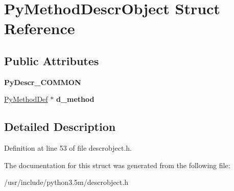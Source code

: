 \hypertarget{structPyMethodDescrObject}{}\section{Py\+Method\+Descr\+Object Struct Reference}
\label{structPyMethodDescrObject}
\subsection*{Public Attributes}
\begin{DoxyCompactItemize}
\item 
{\bfseries Py\+Descr\+\_\+\+C\+O\+M\+M\+ON}\hypertarget{structPyMethodDescrObject_acff11b21ab93f9b085260092e755d4e7}{}\label{structPyMethodDescrObject_acff11b21ab93f9b085260092e755d4e7}

\item 
\hyperlink{structPyMethodDef}{Py\+Method\+Def} $\ast$ {\bfseries d\+\_\+method}\hypertarget{structPyMethodDescrObject_a2ac410c4f8d6288431aa7c915d2bbf35}{}\label{structPyMethodDescrObject_a2ac410c4f8d6288431aa7c915d2bbf35}

\end{DoxyCompactItemize}


\subsection{Detailed Description}


Definition at line 53 of file descrobject.\+h.



The documentation for this struct was generated from the following file\+:\begin{DoxyCompactItemize}
\item 
/usr/include/python3.\+5m/descrobject.\+h\end{DoxyCompactItemize}
